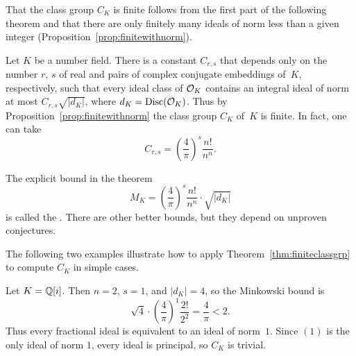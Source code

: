 That the class group $C_K$ is finite follows from the first part of
the following theorem and that there are only finitely many
ideals of norm less than a given integer (Proposition~\ref{prop:finitewithnorm}).
\begin{theorem}\label{thm:finiteclassgrp}
	Let $K$ be a number field.  There is a constant $C_{r,s}$ that
	depends only on the number $r$, $s$ of real and pairs
	of complex conjugate embeddings of~$K$, respectively, such that
	every ideal class of $\mathcal{O}_K$ contains an integral ideal
	of norm at most $C_{r,s}\sqrt{|d_K|}$, where $d_K=\operatorname{Disc}(\mathcal{O}_K)$.
	Thus by Proposition~\ref{prop:finitewithnorm}
	the class group $C_K$ of~$K$ is finite. In fact, one can take
	$$
		C_{r,s} = \left(\frac{4}{\pi}\right)^s\frac{n!}{n^n}.
	$$
\end{theorem}
The explicit bound in the theorem
$$
	M_K = \left(\frac{4}{\pi}\right)^s\frac{n!}{n^n} \cdot \sqrt{|d_K|}
$$
is called the .
There are other better bounds, but they depend on unproven conjectures.

The following two examples illustrate how to apply
Theorem~\ref{thm:finiteclassgrp} to compute $C_K$ in simple cases.
\begin{example}
	Let $K=\mathbb{Q}[i]$.  Then $n=2$, $s=1$, and $|d_K|=4$, so the Minkowski bound is
	$$
		\sqrt{4} \cdot \left(\frac{4}{\pi}\right)^1 \frac{2!}{2^2}
		= \frac{4}{\pi} < 2.
	$$
	Thus every fractional ideal is equivalent to an ideal of norm~$1$.
	Since $(1)$ is the only ideal of norm $1$, every ideal is principal,
	so $C_K$ is trivial.
\end{example}

